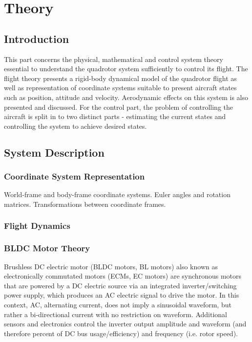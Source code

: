 \documentclass[a4paper]{report}
\begin{document}
%
%
\part{Theory}

\chapter{Introduction}
This part concerns the physical, mathematical and control system theory essential to understand the quadrotor system sufficiently to control its flight. The flight theory presents a rigid-body dynamical model of the quadrotor flight as well as representation of coordinate systems suitable to present aircraft states such as position, attitude and velocity. Aerodynamic effects on this system is also presented and discussed. For the control part, the problem of controlling the aircraft is split in to two distinct parts - estimating the current states and controlling the system to achieve desired states.

\chapter{System Description}

	\section{Coordinate System Representation}
World-frame and body-frame coordinate systems. Euler angles and rotation matrices. Transformations between coordinate frames.

	\section{Flight Dynamics}

	\section{BLDC Motor Theory}
	\label{sec:BLDCMotorTheory}
Brushless DC electric motor (BLDC motors, BL motors) also known as electronically commutated motors (ECMs, EC motors) are synchronous motors that are powered by a DC electric source via an integrated inverter/switching power supply, which produces an AC electric signal to drive the motor. In this context, AC, alternating current, does not imply a sinusoidal waveform, but rather a bi-directional current with no restriction on waveform. Additional sensors and electronics control the inverter output amplitude and waveform (and therefore percent of DC bus usage/efficiency) and frequency (i.e. rotor speed).
\end{document}
